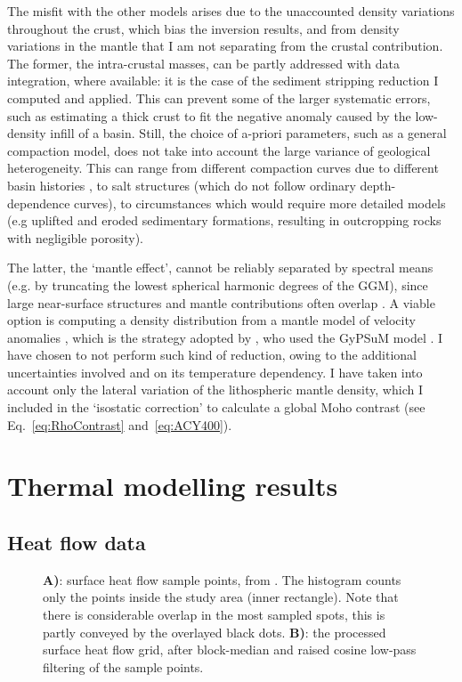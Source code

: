 The misfit with the other models arises due to the unaccounted density variations throughout the crust, which bias the inversion results, and from density variations in the mantle that I am not separating from the crustal contribution.
The former, the intra-crustal masses, can be partly addressed with data integration, where available: it is the case of the sediment stripping reduction I computed and applied.
This can prevent some of the larger systematic errors, such as estimating a thick crust to fit the negative anomaly caused by the low-density infill of a basin.
Still, the choice of a-priori parameters, such as a general compaction model, does not take into account the large variance of geological heterogeneity.
This can range from different compaction curves due to different basin histories \textcite{allen2013basin}, to salt structures (which do not follow ordinary depth-dependence curves), to circumstances which would require more detailed models (e.g uplifted and eroded sedimentary formations, resulting in outcropping rocks with negligible porosity).

The latter, the `mantle effect', cannot be reliably separated by spectral means (e.g. by truncating the lowest spherical harmonic degrees of the GGM), since large near-surface structures and mantle contributions often overlap \parencite{Kaban2004}.
A viable option is computing a density distribution from a mantle model of velocity anomalies \parencite[e.g. ][]{Kuhn2005}, which is the strategy adopted by \textcite{Reguzzoni2015}, who used the GyPSuM model \parencite{Simmons2010}.
I have chosen to not perform such kind of reduction, owing to the additional uncertainties involved and on its temperature dependency.
I have taken into account only the lateral variation of the lithospheric mantle density, which I included in the `isostatic correction' to calculate a global Moho contrast (see Eq.~\ref{eq:RhoContrast} and~\ref{eq:ACY400}).

\section{Thermal modelling results}
\label{s:Appl:DiscTherm}

\subsection{Heat flow data}
\label{ss:Appl:DiscTherm:HF}

\begin{figure}
	\begin{adjustbox}{center}
	\end{adjustbox}
	\caption[Surface heat flow, sample points and block-median processed.]{\textbf{A)}: surface heat flow sample points, from \textcite{globalHF}. The histogram counts only the points inside the study area (inner rectangle). Note that there is considerable overlap in the most sampled spots, this is partly conveyed by the overlayed black dots. \textbf{B)}: the processed surface heat flow grid, after block-median and raised cosine low-pass filtering of the sample points.}
	\label{fig:HFdata}
\end{figure}


